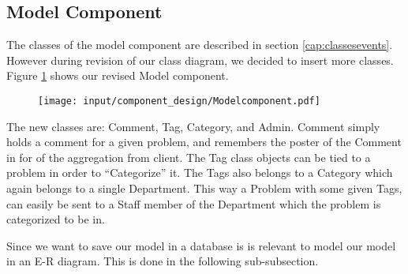 \subsection{Model Component}
\label{sub:modelComponent}
The classes of the model component are described in section \ref{cap:classesevents}.
However during revision of our class diagram, we decided to insert more classes.
Figure \ref{fig:modelComponent} shows our revised Model component.

\begin{figure}[hbt]
	\centering
		\texttt{[image: input/component\_design/Modelcomponent.pdf]}
	\label{fig:modelComponent}
\end{figure}

The new classes are: Comment, Tag, Category, and Admin.
Comment simply holds a comment for a given problem, and remembers the poster of the Comment in for of the aggregation from client.
The Tag class objects can be tied to a problem in order to ``Categorize'' it.
The Tags also belongs to a Category which again belongs to a single Department.
This way a Problem with some given Tags, can easily be sent to a Staff member of the Department which the problem is categorized to be in.

Since we want to save our model in a database is is relevant to model our model in an E-R diagram.
This is done in the following sub-subsection.
